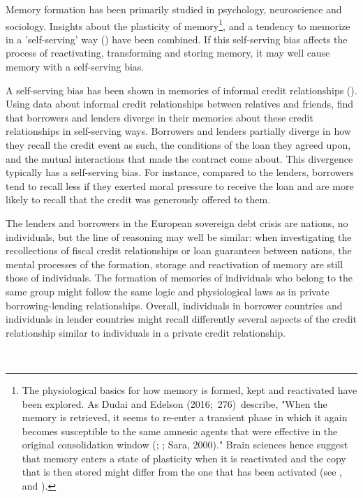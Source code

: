 Memory formation has been primarily studied in psychology, neuroscience and sociology.
Insights about the plasticity of memory\footnote{%
The physiological basics for how memory is formed, kept and reactivated have
been explored. As Dudai and Edelson (2016;\ 276)\ describe, "When the memory
is retrieved, it seems to re-enter a transient phase in which it again
becomes susceptible to the same amnesic agents that were effective in the
original consolidation window (\cite{dudai}; \cite{nader}; Sara,
2000)." Brain sciences hence suggest that memory enters a state of
plasticity when it is reactivated and the copy that is then stored might
differ from the one that has been activated (see \cite{agren}, and \cite{lee}).}, and a tendency to memorize in a 'self-serving' way
(\cite{bell}) have been combined. If this self-serving bias
affects the process of reactivating, transforming and storing memory, it may well
cause memory with a self-serving bias.

A self-serving bias has been shown in memories of informal credit relationships (\cite{dezso}). Using data about informal credit
relationships between relatives and friends, \cite{dezso} find that borrowers and
lenders diverge in their memories about these credit relationships in self-serving
 ways.
Borrowers and lenders partially diverge in how they recall the credit event
as such, the conditions of the loan they agreed upon, and the mutual
interactions that made the contract come about. This divergence typically
has a self-serving bias. For instance, compared to the lenders, borrowers
tend to recall less if they exerted moral pressure to receive the loan and
are more likely to recall that the credit was generously offered to them.

The lenders and borrowers in the European sovereign debt crisis are
nations, no individuals, but the line of reasoning may well be
similar: when investigating the recollections of fiscal credit relationships or
loan guarantees between nations, the mental processes of the formation,
storage and reactivation of memory are still those of individuals.
The formation of memories of individuals who belong to the same group might
follow the same logic and physiological laws as in private
borrowing-lending relationships. Overall, individuals in borrower
countries and individuals in lender countries might recall differently
several aspects of the credit relationship similar to individuals in a private credit relationship. 

\\

